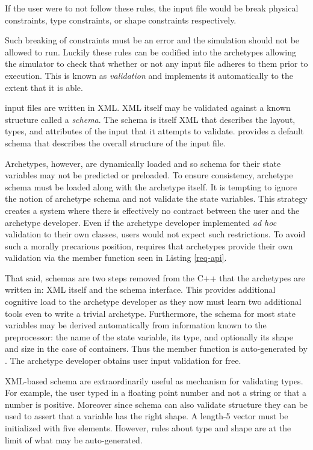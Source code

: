 If the user were to not follow these rules, the input file would be break physical
constraints, type constraints, or shape constraints respectively. 

Such breaking of constraints must be an error and the simulation should not be 
allowed to run. Luckily these rules can be codified into the archetypes allowing 
the simulator to check that whether or not any input file adheres to them prior
to execution. This is known as \emph{validation} and \cyclus implements it 
automatically to the extent that it is able. 

\Cyclus input files are written in \gls{XML}. \gls{XML} itself may be validated against a 
known structure called a \emph{schema}. The schema is itself \gls{XML} that describes 
the layout, types, and attributes of the input that it attempts to validate.
\Cyclus provides a default schema that describes the overall structure of the 
input file.

Archetypes, however, are dynamically loaded and so schema for their state 
variables may not be predicted or preloaded. To ensure consistency, archetype schema 
must be loaded along with the archetype itself.  It is tempting to ignore the 
notion of archetype schema and not validate the state variables.
This strategy creates a system where there is effectively no contract between the 
user and the archetype developer. Even if the archetype developer implemented 
\emph{ad hoc} validation to their own classes, users would not expect such 
restrictions.  To avoid such a morally precarious position, \cyclus requires
that archetypes provide their own validation via the  member 
function seen in Listing \ref{req-api}.

That said, schemas are two steps removed from the C++ that the archetypes
are written in: \gls{XML} itself and the schema interface. This provides additional 
cognitive load to the archetype developer as they now must learn two additional
tools even to write a trivial archetype. Furthermore, the schema for most state
variables may be derived automatically from information known to the preprocessor:
the name of the state variable, its type, and optionally its shape and size in 
the case of containers. Thus the  member function is auto-generated
by \cycpp. The archetype developer obtains user input validation for free.

\gls{XML}-based schema are extraordinarily useful as mechanism for validating types. 
For example, the user typed in a floating point number and not a string or that 
a number is positive.
Moreover since schema can also validate structure they can be used to assert that 
a variable has the right shape. A length-5 vector must be initialized with 
five elements. However, rules about type and shape are at the limit of what may 
be auto-generated.

